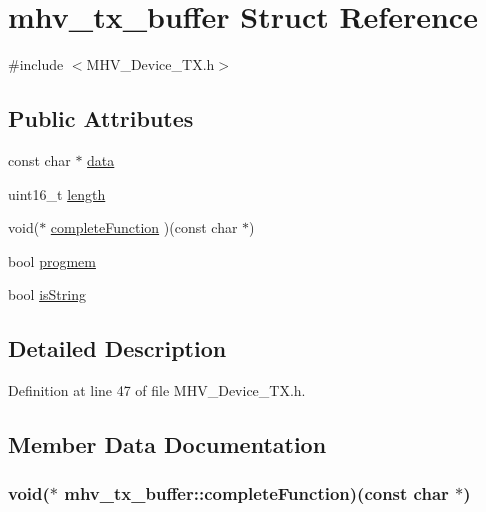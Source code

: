 \hypertarget{structmhv__tx__buffer}{\section{mhv\-\_\-tx\-\_\-buffer Struct Reference}
\label{structmhv__tx__buffer}
}


{\ttfamily \#include $<$M\-H\-V\-\_\-\-Device\-\_\-\-T\-X.\-h$>$}

\subsection*{Public Attributes}
\begin{DoxyCompactItemize}
\item 
const char $\ast$ \hyperlink{structmhv__tx__buffer_a7523481b7a0b1d4972a79a4de6e528af}{data}
\item 
uint16\-\_\-t \hyperlink{structmhv__tx__buffer_ac05ef0da2f6fce474bec691e8e1fb4e2}{length}
\item 
void($\ast$ \hyperlink{structmhv__tx__buffer_a1a50cf4d4aba22fe7d519832fa1d61ff}{complete\-Function} )(const char $\ast$)
\item 
bool \hyperlink{structmhv__tx__buffer_a0b9b692bdd3d83c9a53e19a5c951fb74}{progmem}
\item 
bool \hyperlink{structmhv__tx__buffer_a945fe73e41c397f3c4f7765c97469a35}{is\-String}
\end{DoxyCompactItemize}


\subsection{Detailed Description}


Definition at line 47 of file M\-H\-V\-\_\-\-Device\-\_\-\-T\-X.\-h.



\subsection{Member Data Documentation}
\hypertarget{structmhv__tx__buffer_a1a50cf4d4aba22fe7d519832fa1d61ff}{
\subsubsection[{complete\-Function}]{\setlength{\rightskip}{0pt plus 5cm}void($\ast$ mhv\-\_\-tx\-\_\-buffer\-::complete\-Function)(const char $\ast$)}}\label{structmhv__tx__buffer_a1a50cf4d4aba22fe7d519832fa1d61ff}


